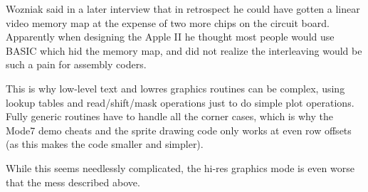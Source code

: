 %
%
%

Wozniak said in a later interview that in retrospect he could have
gotten a linear video memory map at the expense of two more chips
on the circuit board.
Apparently when designing the Apple II he thought most people would use BASIC
which hid the memory map, and did not realize the interleaving would
be such a pain for assembly coders.

This is why low-level text and lowres graphics routines
can be complex, using lookup tables and
read/shift/mask operations just to do simple plot operations.
Fully generic routines have to handle all the corner cases, which is why
the Mode7 demo cheats and the sprite drawing code only works
at even row offsets (as this makes the code smaller and simpler).

While this seems needlessly complicated, the hi-res graphics mode
is even worse that the mess described above.



%
